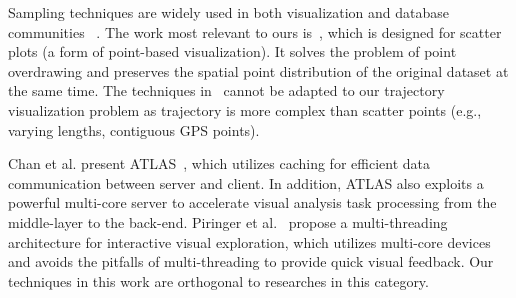 Sampling techniques are widely used in both visualization and database communities ~\cite{battle2013dynamic,chen2014visual,park2016visualization,qin2020making,DBLP:conf/sigmod/DingHCC016,DBLP:journals/pvldb/KimBPIMR15}.
The work most relevant to ours is~\cite{park2016visualization}, which is designed for scatter plots (a form of point-based visualization). It solves the problem of point overdrawing and preserves the spatial point distribution of the original dataset at the same time. The techniques in~\cite{park2016visualization} cannot be adapted to our trajectory visualization problem
as trajectory is more complex than scatter points (e.g., varying lengths, contiguous GPS points).




Chan et al. present ATLAS~\cite{chan2008maintaining}, which utilizes caching for efficient data communication between server and client.
In addition, ATLAS also exploits a powerful multi-core server to accelerate visual analysis task processing from the middle-layer to the back-end.
Piringer et al.~\cite{piringer2009multi} propose a multi-threading architecture for interactive visual exploration,
which utilizes multi-core devices and avoids the pitfalls of multi-threading to provide quick visual feedback.
{Our} techniques in this work are orthogonal to researches in this category.

